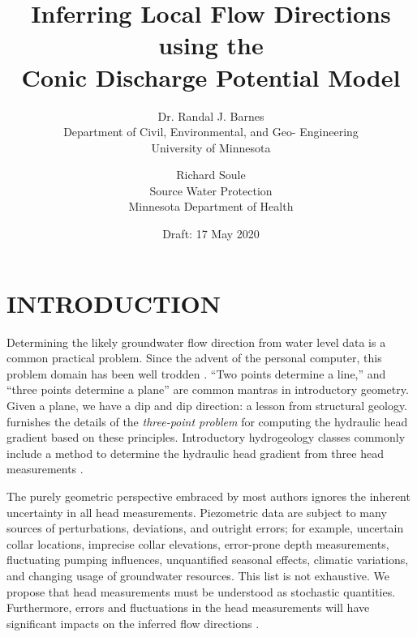 \documentclass[12pt]{article}
\newcommand{\version}{Draft: 17 May 2020}
\begin{document}

\title{Inferring Local Flow Directions using the\\Conic Discharge Potential Model}
\author{
Dr. Randal J. Barnes\\
Department of Civil, Environmental, and Geo- Engineering\\
University of Minnesota
\and
Richard Soule\\
Source Water Protection\\
Minnesota Department of Health\\
}
\date{\version}
\maketitle
\thispagestyle{plain}


\section{INTRODUCTION}
Determining the likely groundwater flow direction from water level data is a common practical problem. Since the advent of the personal computer, this problem domain has been well trodden \citep[e.g.][]{Kelly1989}. ``Two points determine a line,'' and ``three points determine a plane'' are common mantras in introductory geometry. Given a plane, we have a dip and dip direction: a lesson from structural geology. \citet{Pinder1981} furnishes the details of the {\em three-point problem} for computing the hydraulic head gradient based on these principles. Introductory hydrogeology classes commonly include a method to determine the hydraulic head gradient from three head measurements \citep[e.g.][Section 4.12]{Fetter94}.

The purely geometric perspective embraced by most authors ignores the inherent uncertainty in all head measurements. Piezometric data are subject to many sources of perturbations, deviations, and outright errors; for example, uncertain collar locations, imprecise collar elevations, error-prone depth measurements, fluctuating pumping influences, unquantified seasonal effects, climatic variations, and changing usage of groundwater resources. This list is not exhaustive. We propose that head measurements must be understood as stochastic quantities. Furthermore, errors and fluctuations in the head measurements will have significant impacts on the inferred flow directions \citep[e.g.][]{Devlin2007}.
\end{document}

